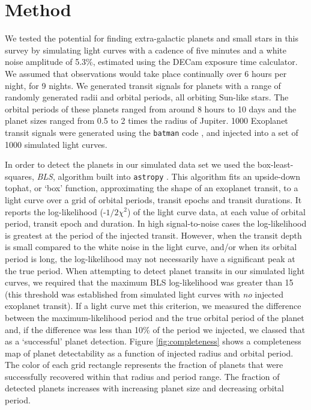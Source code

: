 
\section{Method}

We tested the potential for finding extra-galactic planets and small stars in
this survey by simulating light curves with a cadence of five minutes and a
white noise amplitude of 5.3\%, estimated using the DECam exposure time
calculator.
We assumed that observations would take place continually over 6 hours per
night, for 9 nights.
We generated transit signals for planets with a range of randomly generated
radii and orbital periods, all orbiting Sun-like stars.
The orbital periods of these planets ranged from around 8 hours to 10 days and
the planet sizes ranged from 0.5 to 2 times the radius of Jupiter.
1000 Exoplanet transit signals were generated using the {\tt batman} code
\citep{kreidberg2015}, and injected into a set of 1000 simulated light curves.

In order to detect the planets in our simulated data set we used the
box-least-squares, {\it BLS}, algorithm built into {\tt astropy}
\citep{astropy}.
This algorithm fits an upside-down tophat, or `box' function, approximating
the shape of an exoplanet transit, to a light curve over a grid of orbital
periods, transit epochs and transit durations.
It reports the log-likelihood (-$1/2\chi^2$) of the light curve data, at each
value of orbital period, transit epoch and duration.
In high signal-to-noise cases the log-likelihood is greatest at the period of
the injected transit.
However, when the transit depth is small compared to the white noise in the
light curve, and/or when its orbital period is long, the log-likelihood may not
necessarily have a significant peak at the true period.
When attempting to detect planet transits in our simulated light curves, we
required that the maximum BLS log-likelihood was greater than 15 (this
threshold was established from simulated light curves with {\it no} injected
exoplanet transit).
If a light curve met this criterion, we measured the difference between the
maximum-likelihood period and the true orbital period of the planet and, if
the difference was less than 10\% of the period we injected, we classed that
as a `successful' planet detection.
Figure \ref{fig:completeness} shows a completeness map of planet detectability
as a function of injected radius and orbital period.
The color of each grid rectangle represents the fraction of planets that were
successfully recovered within that radius and period range.
The fraction of detected planets increases with increasing planet size and
decreasing orbital period.

